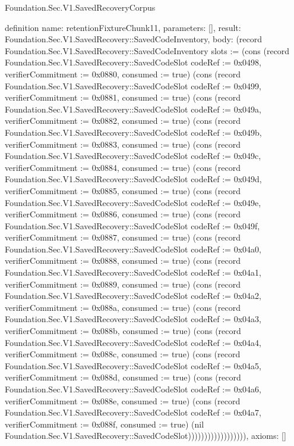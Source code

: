 \begin{lexlean}{Foundation.Sec.V1.SavedRecoveryCorpus}
\begin{semanticmodule}
definition{
  name: retentionFixtureChunk11,
  parameters: [],
  result: Foundation.Sec.V1.SavedRecovery::SavedCodeInventory,
  body: (record Foundation.Sec.V1.SavedRecovery::SavedCodeInventory {slots := (cons (record Foundation.Sec.V1.SavedRecovery::SavedCodeSlot {codeRef := 0x0498, verifierCommitment := 0x0880, consumed := true}) (cons (record Foundation.Sec.V1.SavedRecovery::SavedCodeSlot {codeRef := 0x0499, verifierCommitment := 0x0881, consumed := true}) (cons (record Foundation.Sec.V1.SavedRecovery::SavedCodeSlot {codeRef := 0x049a, verifierCommitment := 0x0882, consumed := true}) (cons (record Foundation.Sec.V1.SavedRecovery::SavedCodeSlot {codeRef := 0x049b, verifierCommitment := 0x0883, consumed := true}) (cons (record Foundation.Sec.V1.SavedRecovery::SavedCodeSlot {codeRef := 0x049c, verifierCommitment := 0x0884, consumed := true}) (cons (record Foundation.Sec.V1.SavedRecovery::SavedCodeSlot {codeRef := 0x049d, verifierCommitment := 0x0885, consumed := true}) (cons (record Foundation.Sec.V1.SavedRecovery::SavedCodeSlot {codeRef := 0x049e, verifierCommitment := 0x0886, consumed := true}) (cons (record Foundation.Sec.V1.SavedRecovery::SavedCodeSlot {codeRef := 0x049f, verifierCommitment := 0x0887, consumed := true}) (cons (record Foundation.Sec.V1.SavedRecovery::SavedCodeSlot {codeRef := 0x04a0, verifierCommitment := 0x0888, consumed := true}) (cons (record Foundation.Sec.V1.SavedRecovery::SavedCodeSlot {codeRef := 0x04a1, verifierCommitment := 0x0889, consumed := true}) (cons (record Foundation.Sec.V1.SavedRecovery::SavedCodeSlot {codeRef := 0x04a2, verifierCommitment := 0x088a, consumed := true}) (cons (record Foundation.Sec.V1.SavedRecovery::SavedCodeSlot {codeRef := 0x04a3, verifierCommitment := 0x088b, consumed := true}) (cons (record Foundation.Sec.V1.SavedRecovery::SavedCodeSlot {codeRef := 0x04a4, verifierCommitment := 0x088c, consumed := true}) (cons (record Foundation.Sec.V1.SavedRecovery::SavedCodeSlot {codeRef := 0x04a5, verifierCommitment := 0x088d, consumed := true}) (cons (record Foundation.Sec.V1.SavedRecovery::SavedCodeSlot {codeRef := 0x04a6, verifierCommitment := 0x088e, consumed := true}) (cons (record Foundation.Sec.V1.SavedRecovery::SavedCodeSlot {codeRef := 0x04a7, verifierCommitment := 0x088f, consumed := true}) (nil Foundation.Sec.V1.SavedRecovery::SavedCodeSlot)))))))))))))))))}),
  axioms: []
}


\end{semanticmodule}
\end{lexlean}
